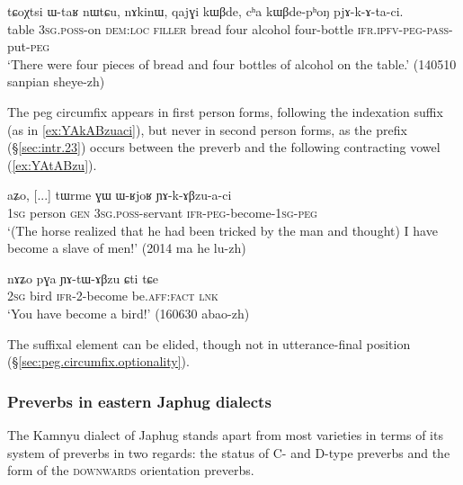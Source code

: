 \begin{exe}
\ex \label{ex:pjAkAtaci.passive}
 \gll   tɕoχtsi ɯ-taʁ nɯtɕu, nɤkinɯ, qajɣi kɯβde, cʰa kɯβde-pʰoŋ pjɤ-k-ɤ-ta-ci. \\
table \textsc{3sg}.\textsc{poss}-on \textsc{dem}:\textsc{loc} \textsc{filler} bread four alcohol four-bottle \textsc{ifr}.\textsc{ipfv}-\textsc{peg}-\textsc{pass}-put-\textsc{peg} \\
\glt `There were four pieces of bread and four bottles of alcohol on the table.' (140510 sanpian sheye-zh)
\end{exe}

The peg circumfix appears in first person forms, following the indexation suffix (as in \ref{ex:YAkABzuaci}), but never in second person forms, as the  prefix (§\ref{sec:intr.23}) occurs between the preverb and the following contracting vowel (\ref{ex:YAtABzu}).

\begin{exe}
\ex \label{ex:YAkABzuaci}
 \gll aʑo, [...] tɯrme ɣɯ ɯ-ʁjoʁ ɲɤ-k-ɤβzu-a-ci \\
 \textsc{1sg} { } person \textsc{gen} \textsc{3sg}.\textsc{poss}-servant \textsc{ifr}-\textsc{peg}-become-\textsc{1sg}-\textsc{peg} \\
 \glt `(The horse realized that he had been tricked by the man and thought) I have become a slave of men!' (2014 ma he lu-zh)
\end{exe}

\begin{exe}
\ex \label{ex:YAtABzu}
 \gll nɤʑo pɣa ɲɤ-tɯ-ɤβzu ɕti tɕe \\
 \textsc{2sg} bird \textsc{ifr}-2-become be.\textsc{aff}:\textsc{fact} \textsc{lnk} \\
 \glt `You have become a bird!' (160630 abao-zh)
 \end{exe}
 
 
The  suffixal element can be elided, though not in utterance-final position (§\ref{sec:peg.circumfix.optionality}).

 
\subsubsection{Preverbs in eastern Japhug dialects} \label{sec:xtokavian.preverbs}
The Kamnyu dialect of Japhug stands apart from most varieties in terms of its system of preverbs in two regards: the status of C- and D-type preverbs and the form of the \textsc{downwards} orientation preverbs.

